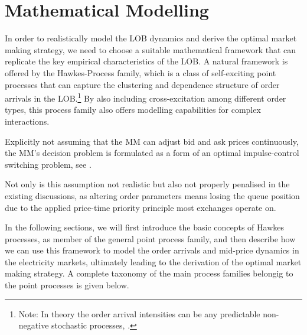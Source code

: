 \documentclass[12pt,a4paper]{cau_thesis}
\begin{document}
\chapter{Mathematical Modelling}\label{ch:mathematical_modelling}
In order to realistically model the LOB dynamics and derive the
optimal market making strategy, we need to choose a suitable
mathematical framework that can replicate the key empirical
characteristics of the LOB. A natural framework is offered by the
Hawkes-Process family, which is a class of self-exciting point
processes that can capture the clustering and dependence structure of
order arrivals in the LOB.\footnote{Note: In theory the order arrival
intensities can be any predictable non-negative stochastic processes, \cite[see ][, p.39]{korhonen2025market}.} By also including cross-excitation among
different order types, this process family also offers modelling
capabilities for complex interactions.

Explicitly not assuming that the MM can adjust bid and ask prices
continuously, the MM's decision problem is formulated as a form of an
optimal impulse-control switching problem, see \cite{law2015pure}.

Not only is this assumption not realistic but also not properly
penalised in the existing discussions, as altering order parameters
means losing the queue position due to the applied price-time
priority principle most exchanges operate on.

In the following sections, we will first introduce the basic concepts
of Hawkes processes, as member of the general point process family,
and then describe how we can use this framework to model the order
arrivals and mid-price dynamics in the electricity markets,
ultimately leading to the derivation of the optimal market making
strategy. A complete taxonomy of the main process families belongig
to the point processes is given below.
\begin{figure}[htbp]
    \vspace*{0.5cm}
    \centering
    \label{fig:point_process_family}
\end{figure}
\end{document}
